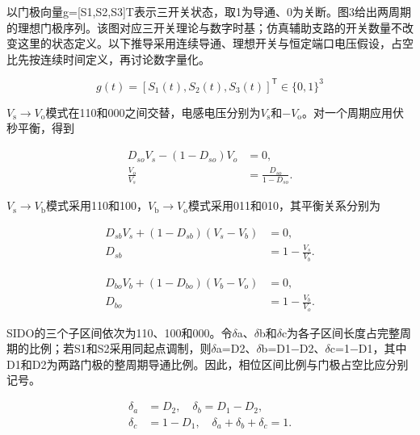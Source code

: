 \documentclass[UTF8,fontset=fandol,a4paper,twocolumn,10pt]{ctexart}
\begin{document}
以门极向量g=[S1,S2,S3]T表示三开关状态，取1为导通、0为关断。图3给出两周期的理想门极序列。该图对应三开关理论与数字时基；仿真辅助支路的开关数量不改变这里的状态定义。以下推导采用连续导通、理想开关与恒定端口电压假设，占空比先按连续时间定义，再讨论数字量化。

\begin{equation}g(t)=[S_1(t),S_2(t),S_3(t)]^{\mathsf T}\in\{0,1\}^{3}\label{eq:2}\end{equation}

$V_{\mathrm s}$$\to$$V_{\mathrm o}$模式在110和000之间交替，电感电压分别为$V_{\mathrm s}$和−$V_{\mathrm o}$。对一个周期应用伏秒平衡，得到

\begin{equation}\begin{aligned}D_{so}V_s-(1-D_{so})V_o&=0,\\ \frac{V_o}{V_s}&=\frac{D_{so}}{1-D_{so}}.\end{aligned}\label{eq:3}\end{equation}

$V_{\mathrm s}$$\to$$V_{\mathrm b}$模式采用110和100，$V_{\mathrm b}$$\to$$V_{\mathrm o}$模式采用011和010，其平衡关系分别为

\begin{equation}\begin{aligned}D_{sb}V_s+(1-D_{sb})(V_s-V_b)&=0,\\ D_{sb}&=1-\frac{V_s}{V_b}.\end{aligned}\label{eq:4}\end{equation}

\begin{equation}\begin{aligned}D_{bo}V_b+(1-D_{bo})(V_b-V_o)&=0,\\ D_{bo}&=1-\frac{V_b}{V_o}.\end{aligned}\label{eq:5}\end{equation}

SIDO的三个子区间依次为110、100和000。令$\delta$a、$\delta$b和$\delta$c为各子区间长度占完整周期的比例；若S1和S2采用同起点调制，则$\delta$a=D2、$\delta$b=D1−D2、$\delta$c=1−D1，其中D1和D2为两路门极的整周期导通比例。因此，相位区间比例与门极占空比应分别记号。

\begin{equation}\begin{aligned}\delta_a&=D_2,\quad \delta_b=D_1-D_2,\\ \delta_c&=1-D_1,\quad\delta_a+\delta_b+\delta_c=1.\end{aligned}\label{eq:6}\end{equation}
\end{document}
